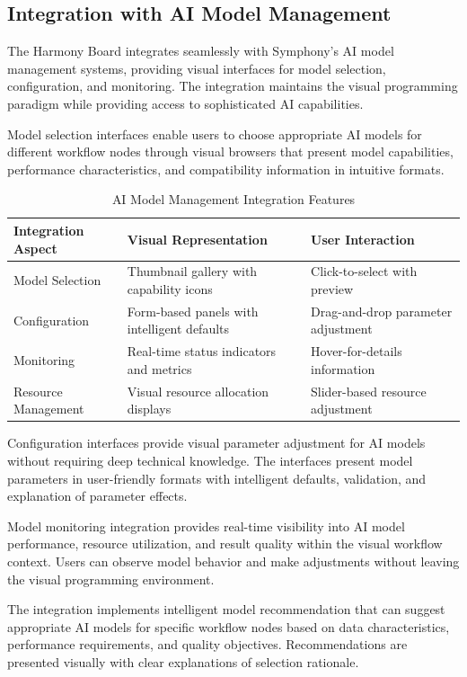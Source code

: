 \subsection*{Integration with AI Model Management}

The Harmony Board integrates seamlessly with Symphony's AI model management systems, providing visual interfaces for model selection, configuration, and monitoring. The integration maintains the visual programming paradigm while providing access to sophisticated AI capabilities.

Model selection interfaces enable users to choose appropriate AI models for different workflow nodes through visual browsers that present model capabilities, performance characteristics, and compatibility information in intuitive formats.

\begin{table}[ht]
\centering
\begin{tabular}{@{}lll@{}}
\toprule
\textbf{Integration Aspect} & \textbf{Visual Representation} & \textbf{User Interaction} \\
\midrule
Model Selection & Thumbnail gallery with capability icons & Click-to-select with preview \\
Configuration & Form-based panels with intelligent defaults & Drag-and-drop parameter adjustment \\
Monitoring & Real-time status indicators and metrics & Hover-for-details information \\
Resource Management & Visual resource allocation displays & Slider-based resource adjustment \\
\bottomrule
\end{tabular}
\caption{AI Model Management Integration Features}
\end{table}

Configuration interfaces provide visual parameter adjustment for AI models without requiring deep technical knowledge. The interfaces present model parameters in user-friendly formats with intelligent defaults, validation, and explanation of parameter effects.

Model monitoring integration provides real-time visibility into AI model performance, resource utilization, and result quality within the visual workflow context. Users can observe model behavior and make adjustments without leaving the visual programming environment.

The integration implements intelligent model recommendation that can suggest appropriate AI models for specific workflow nodes based on data characteristics, performance requirements, and quality objectives. Recommendations are presented visually with clear explanations of selection rationale.

